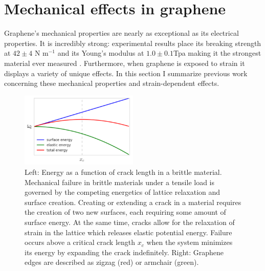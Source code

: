 \documentclass[edeposit,fullpage,draftthesis]{uiucthesis2009}
\begin{document}
        
        
    \section{Mechanical effects in graphene}
    
        Graphene's mechanical properties are nearly as exceptional as its electrical properties. It is incredibly
        strong: experimental results place its breaking strength at $42 \pm 4$ N m$^{-1}$ and its
        Young's modulus at $1.0 \pm 0.1 $Tpa making it the strongest material ever measured \cite{Lee2008}.
        Furthermore, when graphene is exposed to strain it displays a variety of unique effects. 
        In this section I summarize previous work concerning these mechanical properties and
        strain-dependent effects.
        
            \begin{figure}
            \centering
            \includegraphics[width=0.5\textwidth]{images/background/griffith_rip.png}
            \caption[Mechanical failure in graphene]{
            Left: Energy as a function of crack length in a brittle material. 
            Mechanical failure in brittle materials under a tensile load is governed by the competing energetics of 
            lattice relaxation and surface creation. Creating or extending a crack in a material 
            requires the creation of two new surfaces, each requiring some amount of surface energy. 
            At the same time, cracks allow for the relaxation of strain in the lattice which releases elastic potential energy.
            Failure occurs above a critical crack length $x_c$ when the system minimizes its energy by expanding
            the crack indefinitely.
            Right: Graphene edges are described as zigzag (red) or armchair (green).
            }
            \label{fig:zigzag_armchair}
            \end{figure}
      
\end{document}
